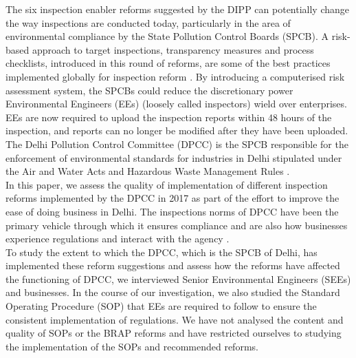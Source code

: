 \documentclass[a4paper, 12pt, twoside]{article}
\begin{document}
                  The six inspection enabler reforms suggested by the DIPP can potentially change the way inspections are conducted today, particularly in the area of environmental compliance by the State Pollution Control Boards (SPCB). A risk-based approach to target inspections, transparency measures and process checklists, introduced in this round of reforms, are some of the best practices implemented globally for inspection reform \parencite{blancflorentin}. By introducing a computerised risk assessment system, the SPCBs could reduce the discretionary power Environmental Engineers (EEs) (loosely called inspectors) wield over enterprises. EEs are now required to upload the inspection reports within 48 hours of the inspection, and reports can no longer be modified after they have been uploaded. \\
                  
                 The Delhi Pollution Control Committee (DPCC) is the SPCB responsible for the enforcement of environmental standards for industries in Delhi stipulated under the Air and Water Acts and Hazardous Waste Management Rules \parencite{DPCCb}. \\
                 
                 In this paper, we assess the quality of implementation of different inspection reforms implemented by the DPCC in 2017 as part of the effort to improve the ease of doing business in Delhi. The inspections norms of DPCC have been the primary vehicle through which it ensures compliance and are also how businesses experience regulations and interact with the agency \parencite{DPCCb}. \\
                 
                 To study the extent to which the DPCC, which is the SPCB of Delhi, has implemented these reform suggestions and assess how the reforms have affected the functioning of DPCC, we interviewed Senior Environmental Engineers (SEEs) and businesses. In the course of our investigation, we also studied the Standard Operating Procedure (SOP) that EEs are required to follow to ensure the consistent implementation of regulations. We have not analysed the content and quality of SOPs or the BRAP reforms and have restricted ourselves to studying the implementation of the SOPs and recommended reforms. \\
                 
\end{document}
